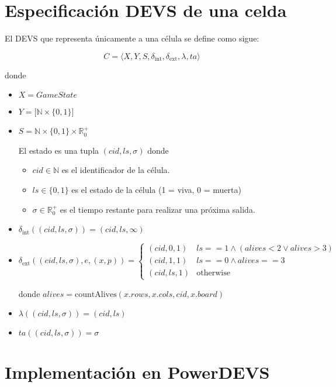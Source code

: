 \documentclass[]{article}
\newcommand{\dint}{\delta_{\text{int}}}
\newcommand{\dext}{\delta_{\text{ext}}}
\newcommand{\estado}{(cid,ls,\sigma)}
\newcommand{\R}{\mathbb{R}}
\newcommand{\N}{\mathbb{N}}
\begin{document}
\section{Especificación DEVS de una celda}

El DEVS que representa únicamente a una célula se define como sigue:

\[ C = \langle X, Y, S, \dint, \dext, \lambda, ta \rangle \]

donde

\begin{itemize}
  \item $X = GameState $

  \item $Y = \big[\N \times \{0,1\} \big]$

  \item $S = \N \times \{0, 1\} \times   \R_0^+$

    El estado es una tupla $(cid, ls, \sigma)$ donde

    \begin{itemize}
      \item $cid \in \N$ es el identificador de la célula.
      \item $ls \in \{0, 1\}$ es el estado de la célula (1 = viva, 0 = muerta)
      \item $\sigma \in \R_0^+$ es el tiempo restante para realizar una próxima salida.
    \end{itemize}

  \item $\dint(\estado) = (cid,ls,\infty)$


  \item $\dext(\estado, e, (x, p)) = \begin{cases}
    (cid,0,1) & ls == 1 \land (alives < 2 \lor alives > 3)  \\
    (cid,1,1) & ls == 0 \land alives == 3 \\
    (cid,ls,1) & \text{otherwise }
  \end{cases}$

    donde $alives = \text{countAlives}(x.rows,x.cols,cid,x.board)$
  \item $\lambda(\estado) = (cid,ls) $
  \item $ta(\estado) = \sigma$
\end{itemize}



\section{Implementación en PowerDEVS}
\end{document}
